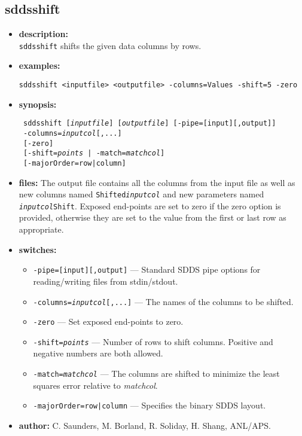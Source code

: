 \newpage 
\subsection{sddsshift} 
\label{sddsshift} 
 
\begin{itemize} 
\item {\bf description:} \hspace*{1mm}\\ 
{\tt sddsshift} shifts the given data columns by rows.
\item {\bf examples:} 
\begin{flushleft}
{\tt sddsshift <inputfile> <outputfile> -columns=Values -shift=5 -zero }
\end{flushleft} 
\item {\bf synopsis:}  
\begin{flushleft}
{\tt 
sddsshift [{\em inputfile}] [{\em outputfile}] [-pipe=[input][,output]] \\ \
-columns={\em inputcol}[,...] \\ \
{}[-zero] \\ \
{}[-shift={\em points} | -match={\em matchcol}] \\ \
{}[-majorOrder=row|column]}
\end{flushleft} 
\item {\bf files:} 
The output file contains all the columns from the input file as well as new columns named {\tt Shifted{\em inputcol}} and new parameters named {\tt {\em inputcol}Shift}. Exposed end-points are set to zero if the zero option is provided, otherwise they are set to the value from the first or last row as appropriate.
\item {\bf switches:} 
    \begin{itemize} 
    \item {\tt -pipe=[input][,output]} --- Standard SDDS pipe options for reading/writing files from stdin/stdout.
    \item {\tt -columns={\em inputcol}[,...]} --- The names of the columns to be shifted.
    \item {\tt -zero} --- Set exposed end-points to zero.
    \item {\tt -shift={\em points}} --- Number of rows to shift columns. Positive and negative numbers are both allowed.
    \item {\tt -match={\em matchcol}} --- The columns are shifted to minimize the least squares error relative to {\em matchcol}.
    \item {\tt -majorOrder=row|column} --- Specifies the binary SDDS layout.
\end{itemize} 

\item {\bf author:} C. Saunders, M. Borland, R. Soliday, H. Shang, ANL/APS. 
\end{itemize} 
 
